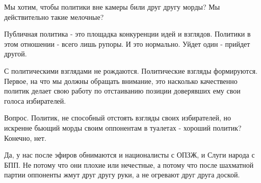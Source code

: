 Мы хотим, чтобы политики вне камеры били друг другу морды? Мы действительно
такие мелочные? 

Публичная политика - это площадка конкуренции идей и взглядов. Политики в этом
отношении - всего лишь рупоры. И это нормально. Уйдет один - прийдет другой. 

С политическими взглядами не рождаются. Политические взгляды формируются.
Первое, на что мы должны обращать внимание, это насколько качественно политик
делает свою работу по отстаиванию позиции доверявших ему свои голоса
избирателей.

Вопрос. Политик, не способный отстоять взгляды своих избирателей, но искренне
бьющий морды своим оппонентам в туалетах - хороший политик? Конечно, нет.

Да, у нас после эфиров обнимаются и националисты с ОПЗЖ, и Слуги народа с БПП.
Не потому что они плохие или нечестные, а потому что после шахматной партии
оппоненты жмут друг другу руки, а не огревают друг друга доской.

